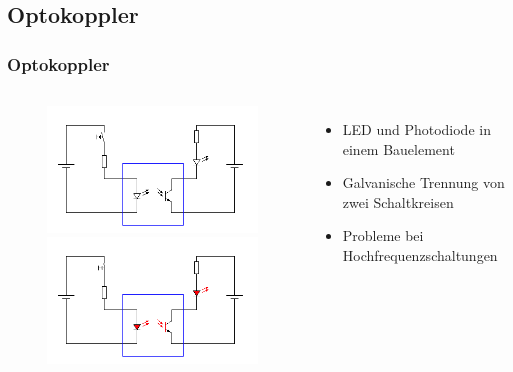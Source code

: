 \subsection*{Optokoppler}
\begin{frame}
  \frametitle{Optokoppler}
  \begin{columns}[c]
    \begin{center}
      \begin{figure}
        \includegraphics[width=1\textwidth,height=.35\textheight,keepaspectratio]{a05/Optokoppler_Aus.png}\\
        \includegraphics[width=1\textwidth,height=.35\textheight,keepaspectratio]{a05/Optokoppler_An.png}
      \end{figure}
      \tiny \hyperlink{refs}{\cite{wm}}
    \end{center}
    \begin{itemize}
      \item LED und Photodiode in einem Bauelement
      \item Galvanische Trennung von zwei Schaltkreisen
      \item Probleme bei Hochfrequenzschaltungen
    \end{itemize}
  \end{columns}
\end{frame}

